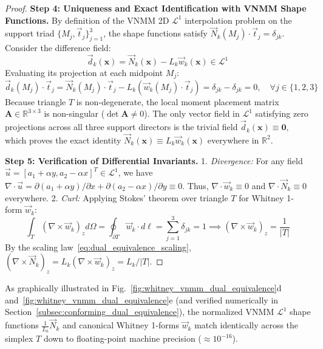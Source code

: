 \documentclass[preprint,12pt]{elsarticle}
\begin{document}
\begin{proof}
\textbf{Step 4: Uniqueness and Exact Identification with VNMM Shape Functions.} 
By definition of the VNMM 2D $\mathcal{L}^1$ interpolation problem on the support triad $\{M_j, \vec{t}_j\}_{j=1}^3$, the shape functions satisfy $\vec{N}_k(M_j) \cdot \vec{t}_j = \delta_{jk}$. Consider the difference field:
\begin{equation}
\vec{d}_k(\mathbf{x}) = \vec{N}_k(\mathbf{x}) - L_k \vec{w}_k(\mathbf{x}) \in \mathcal{L}^1
\end{equation}
Evaluating its projection at each midpoint $M_j$:
\begin{equation}
\vec{d}_k(M_j) \cdot \vec{t}_j = \vec{N}_k(M_j) \cdot \vec{t}_j - L_k \left( \vec{w}_k(M_j) \cdot \vec{t}_j \right) = \delta_{jk} - \delta_{jk} = 0, \quad \forall j \in \{1, 2, 3\}
\end{equation}
Because triangle $T$ is non-degenerate, the local moment placement matrix $\mathbf{A} \in \mathbb{R}^{3 \times 3}$ is non-singular ($\det \mathbf{A} \neq 0$). The only vector field in $\mathcal{L}^1$ satisfying zero projections across all three support directors is the trivial field $\vec{d}_k(\mathbf{x}) \equiv \mathbf{0}$, which proves the exact identity $\vec{N}_k(\mathbf{x}) \equiv L_k \vec{w}_k(\mathbf{x})$ everywhere in $\mathbb{R}^2$.

\textbf{Step 5: Verification of Differential Invariants.} 
1. \textit{Divergence:} For any field $\vec{u} = [a_1 + \alpha y, a_2 - \alpha x]^T \in \mathcal{L}^1$, we have $\nabla \cdot \vec{u} = \partial(a_1 + \alpha y)/\partial x + \partial(a_2 - \alpha x)/\partial y \equiv 0$. Thus, $\nabla \cdot \vec{w}_k \equiv 0$ and $\nabla \cdot \vec{N}_k \equiv 0$ everywhere.
2. \textit{Curl:} Applying Stokes' theorem over triangle $T$ for Whitney 1-form $\vec{w}_k$:
\begin{equation}
\int_T (\nabla \times \vec{w}_k)_z d\Omega = \oint_{\partial T} \vec{w}_k \cdot d\boldsymbol{\ell} = \sum_{j=1}^3 \delta_{jk} = 1 \implies (\nabla \times \vec{w}_k)_z = \frac{1}{|T|}
\end{equation}
By the scaling law~\eqref{eq:dual_equivalence_scaling}, $(\nabla \times \vec{N}_k)_z = L_k (\nabla \times \vec{w}_k)_z = L_k / |T|$.
\end{proof}

As graphically illustrated in Fig.~\ref{fig:whitney_vnmm_dual_equivalence}d and~\ref{fig:whitney_vnmm_dual_equivalence}e (and verified numerically in Section~\ref{subsec:conforming_dual_equivalence}), the normalized VNMM $\mathcal{L}^1$ shape functions $\frac{1}{L_k}\vec{N}_k$ and canonical Whitney 1-forms $\vec{w}_k$ match identically across the simplex $T$ down to floating-point machine precision ($\approx 10^{-16}$).
\end{document}
